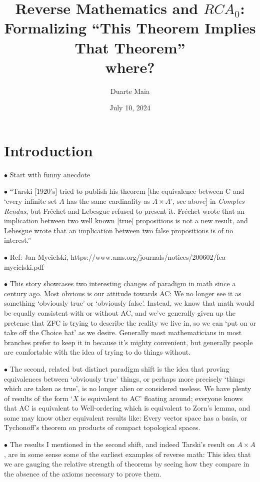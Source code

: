 \documentclass{article}
\title{Reverse Mathematics and $RCA_0$: Formalizing ``This Theorem Implies That Theorem''\\
where?}
\author{Duarte Maia}
\date{July 10, 2024}
\theoremstyle{nonumberplain}
\newcommand{\Choice}{\mathrm{C}}
\newcommand\point[1]{\noindent \hspace{\labelsep} $\bullet$ #1 \smallskip}
\begin{document}
\maketitle

\section{Introduction}

\point{Start with funny anecdote}

\point{``Tarski [1920's] tried to publish his theorem [the equivalence between $\Choice$ and `every infinite set $A$ has the same cardinality as $A \times A$', see above] in \textit{Comptes Rendus}, but Fréchet and Lebesgue refused to present it. Fréchet wrote that an implication between two well known [true] propositions is not a new result, and Lebesgue wrote that an implication between two false propositions is of no interest.''}

\point{Ref: Jan Mycielski, https://www.ams.org/journals/notices/200602/fea-mycielski.pdf}

\point{This story showcases two interesting changes of paradigm in math since a century ago. Most obvious is our attitude towards AC: We no longer see it as something `obviously true' or `obviously false'. Instead, we know that math would be equally consistent with or without AC, and we've generally given up the pretense that ZFC is trying to describe the reality we live in, so we can `put on or take off the Choice hat' as we desire. Generally most mathematicians in most branches prefer to keep it in because it's mighty convenient, but generally people are comfortable with the idea of trying to do things without.}

\point{The second, related but distinct paradigm shift is the idea that proving equivalences between `obviously true' things, or perhaps more precisely `things which are taken as true', is no longer alien or considered useless. We have plenty of results of the form `$X$ is equivalent to AC' floating around; everyone knows that AC is equivalent to Well-ordering which is equivalent to Zorn's lemma, and some may know other equivalent results like: Every vector space has a basis, or Tychonoff's theorem on products of compact topological spaces.}

\point{The results I mentioned in the second shift, and indeed Tarski's result on $A\times A$, are in some sense some of the earliest examples of reverse math: This idea that we are gauging the relative strength of theorems by seeing how they compare in the absence of the axioms necessary to prove them.}
\end{document}
